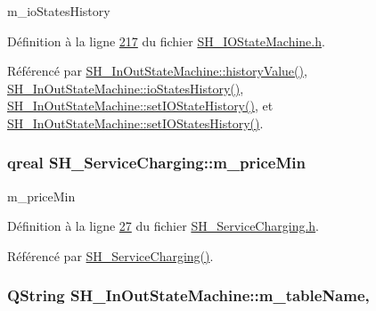 m\-\_\-io\-States\-History 



Définition à la ligne \hyperlink{SH__IOStateMachine_8h_source_l00217}{217} du fichier \hyperlink{SH__IOStateMachine_8h_source}{S\-H\-\_\-\-I\-O\-State\-Machine.\-h}.



Référencé par \hyperlink{classSH__InOutStateMachine_a84fb2b2c2105cae9c590c0d15960854a}{S\-H\-\_\-\-In\-Out\-State\-Machine\-::history\-Value()}, \hyperlink{classSH__InOutStateMachine_a4ec3ebb4c40ea57c63afdf5976e62a94}{S\-H\-\_\-\-In\-Out\-State\-Machine\-::io\-States\-History()}, \hyperlink{classSH__InOutStateMachine_a4b72e6da839782a211692a4d728c3925}{S\-H\-\_\-\-In\-Out\-State\-Machine\-::set\-I\-O\-State\-History()}, et \hyperlink{classSH__InOutStateMachine_ab35839e7880506286ebb5a11c2a924c2}{S\-H\-\_\-\-In\-Out\-State\-Machine\-::set\-I\-O\-States\-History()}.

\hypertarget{classSH__ServiceCharging_a44584a7ff1edd6ae03c4f77544136c13}{
\subsubsection[{m\-\_\-price\-Min}]{\setlength{\rightskip}{0pt plus 5cm}qreal S\-H\-\_\-\-Service\-Charging\-::m\-\_\-price\-Min\hspace{0.3cm}{\ttfamily [private]}}}\label{classSH__ServiceCharging_a44584a7ff1edd6ae03c4f77544136c13}


m\-\_\-price\-Min 



Définition à la ligne \hyperlink{SH__ServiceCharging_8h_source_l00027}{27} du fichier \hyperlink{SH__ServiceCharging_8h_source}{S\-H\-\_\-\-Service\-Charging.\-h}.



Référencé par \hyperlink{classSH__ServiceCharging_afa5273d046049b1c2b020a6a19a8290b}{S\-H\-\_\-\-Service\-Charging()}.

\hypertarget{classSH__InOutStateMachine_acc0f5d5133af2dcca30939f53ec8837b}{
\subsubsection[{m\-\_\-table\-Name}]{\setlength{\rightskip}{0pt plus 5cm}Q\-String S\-H\-\_\-\-In\-Out\-State\-Machine\-::m\-\_\-table\-Name\hspace{0.3cm}{\ttfamily [protected]}, {\ttfamily [inherited]}}}\label{classSH__InOutStateMachine_acc0f5d5133af2dcca30939f53ec8837b}


